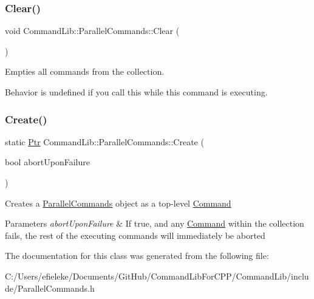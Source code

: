 \subsubsection{\texorpdfstring{Clear()}{Clear()}}
{\footnotesize\ttfamily void Command\+Lib\+::\+Parallel\+Commands\+::\+Clear (\begin{DoxyParamCaption}{ }\end{DoxyParamCaption})}



Empties all commands from the collection.

Behavior is undefined if you call this while this command is executing.\mbox{\label{class_command_lib_1_1_parallel_commands_ab75ed6ec91fa1c4652a796a6c0f6868e}} 
\subsubsection{\texorpdfstring{Create()}{Create()}}
{\footnotesize\ttfamily static \mbox{\hyperlink{class_command_lib_1_1_command_a3b3e4f00144373299df5c6bb1acc319d}{Ptr}} Command\+Lib\+::\+Parallel\+Commands\+::\+Create (\begin{DoxyParamCaption}\item[{bool}]{abort\+Upon\+Failure }\end{DoxyParamCaption})\hspace{0.3cm}{\ttfamily [static]}}



Creates a \mbox{\hyperlink{class_command_lib_1_1_parallel_commands}{Parallel\+Commands}} object as a top-\/level \mbox{\hyperlink{class_command_lib_1_1_command}{Command}} 


\begin{DoxyParams}{Parameters}
{\em abort\+Upon\+Failure} & If true, and any \mbox{\hyperlink{class_command_lib_1_1_command}{Command}} within the collection fails, the rest of the executing commands will immediately be aborted \\
\hline
\end{DoxyParams}


The documentation for this class was generated from the following file\+:\begin{DoxyCompactItemize}
\item 
C\+:/\+Users/efieleke/\+Documents/\+Git\+Hub/\+Command\+Lib\+For\+C\+P\+P/\+Command\+Lib/include/Parallel\+Commands.\+h\end{DoxyCompactItemize}

